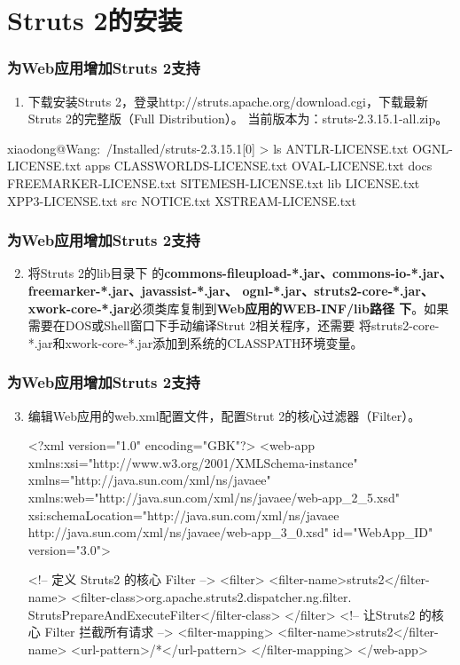 \section{Struts 2的安装}
\begin{frame}[fragile] %
\frametitle{为Web应用增加Struts 2支持}
\begin{enumerate}%
\item 下载安装Struts 2，登录http://struts.apache.org/download.cgi，下载最新Struts 2的完整版（Full Distribution）。
  当前版本为：struts-2.3.15.1-all.zip。
\end{enumerate}
\begin{shCode}
[18:10]xiaodong@Wang:~/Installed/struts-2.3.15.1[0]
> ls
ANTLR-LICENSE.txt       OGNL-LICENSE.txt        apps
CLASSWORLDS-LICENSE.txt OVAL-LICENSE.txt        docs
FREEMARKER-LICENSE.txt  SITEMESH-LICENSE.txt    lib
LICENSE.txt             XPP3-LICENSE.txt        src
NOTICE.txt              XSTREAM-LICENSE.txt
\end{shCode}
\end{frame}

\begin{frame}[fragile] %
\frametitle{为Web应用增加Struts 2支持}
\begin{enumerate}\setcounter{enumi}{1} %
\item 将Struts 2的lib目录下
  的{\Red\bf commons-fileupload-*.jar、commons-io-*.jar、freemarker-*.jar、javassist-*.jar、
  ognl-*.jar、struts2-core-*.jar、xwork-core-*.jar}必须类库复制到{\bf\Red Web应用的WEB-INF/lib路径
  下}。如果需要在DOS或Shell窗口下手动编译Strut 2相关程序，还需要
  将struts2-core-*.jar和xwork-core-*.jar添加到系统的CLASSPATH环境变量。
\end{enumerate}
\end{frame}

\begin{frame}[fragile] %
\frametitle{为Web应用增加Struts 2支持}
\begin{enumerate}\setcounter{enumi}{2} %
\item 编辑Web应用的web.xml配置文件，配置Strut 2的核心过滤器（Filter）。
\begin{xmlCode}\footnotesize
<?xml version="1.0" encoding="GBK"?>
<web-app xmlns:xsi="http://www.w3.org/2001/XMLSchema-instance" 
xmlns="http://java.sun.com/xml/ns/javaee" 
xmlns:web="http://java.sun.com/xml/ns/javaee/web-app_2_5.xsd" 
xsi:schemaLocation="http://java.sun.com/xml/ns/javaee 
http://java.sun.com/xml/ns/javaee/web-app_3_0.xsd" 
id="WebApp_ID" version="3.0">

	<!-- 定义 Struts2 的核心 Filter -->
	<filter>
		<filter-name>struts2</filter-name>
		<filter-class>org.apache.struts2.dispatcher.ng.filter.
                StrutsPrepareAndExecuteFilter</filter-class>
	</filter>
	<!-- 让Struts2 的核心 Filter 拦截所有请求 -->
	<filter-mapping>
		<filter-name>struts2</filter-name>
		<url-pattern>/*</url-pattern>
	</filter-mapping>
</web-app>   
\end{xmlCode}
\end{enumerate}
\end{frame}

